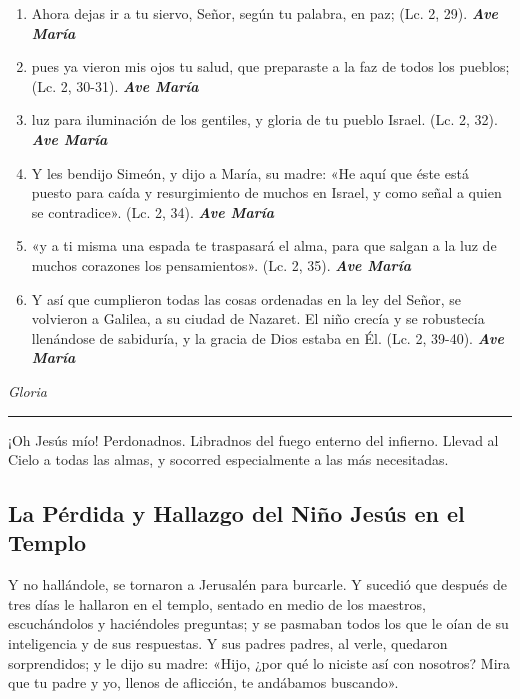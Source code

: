 \documentclass[a4paper,11pt, oneside]{report}
\begin{document}
{{\begin{enumerate}
      \item Ahora dejas ir a tu siervo, Señor, según tu palabra, en paz; (Lc. 2, 29). \textbf{\textit{Ave María}}

      \item pues ya vieron mis ojos tu salud, que preparaste a la faz de todos los pueblos; (Lc. 2, 30-31). \textbf{\textit{Ave María}}

      \item luz para iluminación de los gentiles, y gloria de tu pueblo Israel. (Lc. 2, 32). \textbf{\textit{Ave María}}

      \item Y les bendijo Simeón, y dijo a María, su madre: «He aquí que éste está puesto para caída y resurgimiento de muchos en Israel, y como
      señal a quien se contradice». (Lc. 2, 34). \textbf{\textit{Ave María}}

      \item «y a ti misma una espada te traspasará el alma, para que salgan a la luz de muchos corazones los pensamientos». (Lc. 2, 35). \textbf{\textit{Ave María}}

      \item Y así que cumplieron todas las cosas ordenadas en la ley del Señor, se volvieron a Galilea, a su ciudad de Nazaret. El niño crecía
      y se robustecía llenándose de sabiduría, y la gracia de Dios estaba en Él. (Lc. 2, 39-40). \textbf{\textit{Ave María}} 

    \end{enumerate}
    \indent\textit{Gloria}
      
    \begin{center}\rule{1\linewidth}{\linethickness}\end{center}
 
    \medskip
    \hypertarget{finalPresentacion}{¡Oh Jesús mío! Perdonadnos. Libradnos del fuego enterno del infierno. Llevad al Cielo a todas las almas, y socorred especialmente a las más 
    necesitadas.}
  }    
              
  \subsection*{La Pérdida y Hallazgo del Niño Jesús en el Templo}
  {

    Y no hallándole, se tornaron a Jerusalén para burcarle. Y sucedió que después de tres días le hallaron en el templo, sentado en medio de los maestros,
    escuchándolos y haciéndoles preguntas; y se pasmaban todos los que le oían de su inteligencia y de sus respuestas. Y sus padres padres, al verle, quedaron  
    sorprendidos; y le dijo su madre: «Hijo, ¿por qué lo niciste así con nosotros? Mira que tu padre y yo, llenos de aflicción, te andábamos buscando».
    
}}
\end{document}
